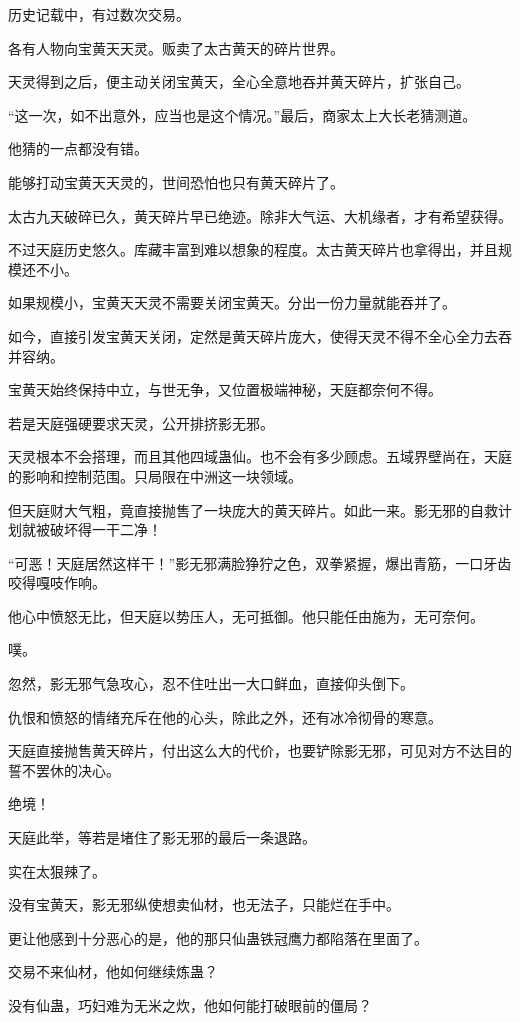 \begin{this_body}
历史记载中，有过数次交易。

各有人物向宝黄天天灵。贩卖了太古黄天的碎片世界。

天灵得到之后，便主动关闭宝黄天，全心全意地吞并黄天碎片，扩张自己。

“这一次，如不出意外，应当也是这个情况。”最后，商家太上大长老猜测道。

他猜的一点都没有错。

能够打动宝黄天天灵的，世间恐怕也只有黄天碎片了。

太古九天破碎已久，黄天碎片早已绝迹。除非大气运、大机缘者，才有希望获得。

不过天庭历史悠久。库藏丰富到难以想象的程度。太古黄天碎片也拿得出，并且规模还不小。

如果规模小，宝黄天天灵不需要关闭宝黄天。分出一份力量就能吞并了。

如今，直接引发宝黄天关闭，定然是黄天碎片庞大，使得天灵不得不全心全力去吞并容纳。

宝黄天始终保持中立，与世无争，又位置极端神秘，天庭都奈何不得。

若是天庭强硬要求天灵，公开排挤影无邪。

天灵根本不会搭理，而且其他四域蛊仙。也不会有多少顾虑。五域界壁尚在，天庭的影响和控制范围。只局限在中洲这一块领域。

但天庭财大气粗，竟直接抛售了一块庞大的黄天碎片。如此一来。影无邪的自救计划就被破坏得一干二净！

“可恶！天庭居然这样干！”影无邪满脸狰狞之色，双拳紧握，爆出青筋，一口牙齿咬得嘎吱作响。

他心中愤怒无比，但天庭以势压人，无可抵御。他只能任由施为，无可奈何。

噗。

忽然，影无邪气急攻心，忍不住吐出一大口鲜血，直接仰头倒下。

仇恨和愤怒的情绪充斥在他的心头，除此之外，还有冰冷彻骨的寒意。

天庭直接抛售黄天碎片，付出这么大的代价，也要铲除影无邪，可见对方不达目的誓不罢休的决心。

绝境！

天庭此举，等若是堵住了影无邪的最后一条退路。

实在太狠辣了。

没有宝黄天，影无邪纵使想卖仙材，也无法子，只能烂在手中。

更让他感到十分恶心的是，他的那只仙蛊铁冠鹰力都陷落在里面了。

交易不来仙材，他如何继续炼蛊？

没有仙蛊，巧妇难为无米之炊，他如何能打破眼前的僵局？


\end{this_body}
